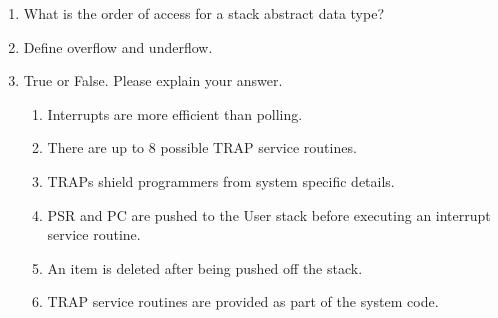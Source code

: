 \documentclass{article}
\begin{document}
\begin{enumerate}[label=(\alph*)]
    \item What is the order of access for a stack abstract data type?
\newline
        \newline
        \newline
    \item Define overflow and underflow.
\newline
        \newline
        \newline
    \item True or False. Please explain your answer.
    \begin{enumerate}[label=\roman*.]
        \item Interrupts are more efficient than polling.
        \newline
        \newline
        \newline
        \item There are up to 8 possible TRAP service routines.
        \newline
        \newline
        \newline
        \item TRAPs shield programmers from system specific details.
        \newline
        \newline
        \newline
        \item PSR and PC are pushed to the User stack before executing an interrupt service routine.
        \newline
        \newline
        \newline
        \item An item is deleted after being pushed off the stack.
        \newline
        \newline
        \newline
        \item TRAP service routines are provided as part of the system code.

    \end{enumerate}
\end{enumerate}
\end{document}
